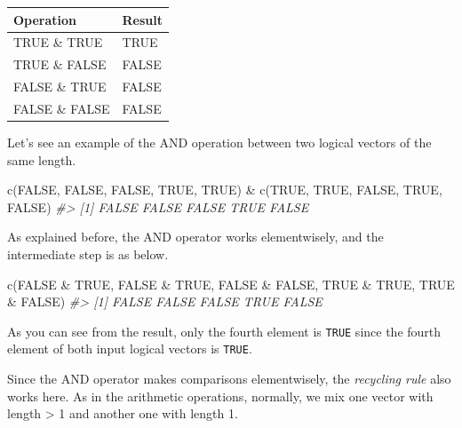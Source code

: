 \documentclass[
]{book}
\newenvironment{Shaded}{\begin{snugshade}}{\end{snugshade}}
\newcommand{\CommentTok}[1]{\textcolor[rgb]{0.56,0.35,0.01}{\textit{#1}}}
\newcommand{\ConstantTok}[1]{\textcolor[rgb]{0.00,0.00,0.00}{#1}}
\newcommand{\FunctionTok}[1]{\textcolor[rgb]{0.00,0.00,0.00}{#1}}
\newcommand{\NormalTok}[1]{#1}
\newcommand{\SpecialCharTok}[1]{\textcolor[rgb]{0.00,0.00,0.00}{#1}}
\begin{document}
\begin{tabular}{l|l}
\hline
Operation & Result\\
\hline
TRUE \& TRUE & TRUE\\
\hline
TRUE \& FALSE & FALSE\\
\hline
FALSE \& TRUE & FALSE\\
\hline
FALSE \& FALSE & FALSE\\
\hline
\end{tabular}

Let's see an example of the AND operation between two logical vectors of the same length.

\begin{Shaded}
\begin{Highlighting}[]
\FunctionTok{c}\NormalTok{(}\ConstantTok{FALSE}\NormalTok{, }\ConstantTok{FALSE}\NormalTok{, }\ConstantTok{FALSE}\NormalTok{, }\ConstantTok{TRUE}\NormalTok{, }\ConstantTok{TRUE}\NormalTok{) }\SpecialCharTok{\&} \FunctionTok{c}\NormalTok{(}\ConstantTok{TRUE}\NormalTok{, }\ConstantTok{TRUE}\NormalTok{, }\ConstantTok{FALSE}\NormalTok{, }\ConstantTok{TRUE}\NormalTok{, }\ConstantTok{FALSE}\NormalTok{)}
\CommentTok{\#\textgreater{} [1] FALSE FALSE FALSE  TRUE FALSE}
\end{Highlighting}
\end{Shaded}

As explained before, the AND operator works elementwisely, and the intermediate step is as below.

\begin{Shaded}
\begin{Highlighting}[]
\FunctionTok{c}\NormalTok{(}\ConstantTok{FALSE} \SpecialCharTok{\&} \ConstantTok{TRUE}\NormalTok{, }\ConstantTok{FALSE} \SpecialCharTok{\&} \ConstantTok{TRUE}\NormalTok{, }\ConstantTok{FALSE} \SpecialCharTok{\&} \ConstantTok{FALSE}\NormalTok{, }\ConstantTok{TRUE} \SpecialCharTok{\&} \ConstantTok{TRUE}\NormalTok{, }\ConstantTok{TRUE} \SpecialCharTok{\&} \ConstantTok{FALSE}\NormalTok{)}
\CommentTok{\#\textgreater{} [1] FALSE FALSE FALSE  TRUE FALSE}
\end{Highlighting}
\end{Shaded}

As you can see from the result, only the fourth element is \texttt{TRUE} since the fourth element of both input logical vectors is \texttt{TRUE}.

Since the AND operator makes comparisons elementwisely, the \emph{recycling rule} also works here. As in the arithmetic operations, normally, we mix one vector with length \textgreater{} 1 and another one with length 1.
\end{document}
